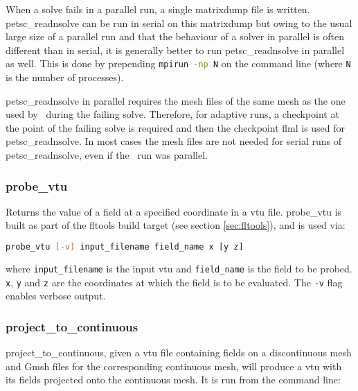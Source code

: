 When a solve fails in a parallel run, a single matrixdump file is written. petsc\_readnsolve can be run in serial on this matrixdump but owing to the usual large size of a parallel run and that the behaviour of a solver in parallel is often different than in serial, it is generally better to run petsc\_readnsolve in parallel as well. This is done by prepending \lstinline[language = Bash]+mpirun -np N+ on the command line (where \lstinline[language = Bash]+N+ is the number of processes).

petsc\_readnsolve in parallel requires the mesh files of the same mesh as the one used by \fluidity\ during the failing solve. Therefore, for adaptive runs, a checkpoint at the point of the failing solve is required and then the checkpoint flml is used for petsc\_readnsolve. In most cases the mesh files are not needed for serial runs of petsc\_readnsolve, even if the \fluidity\ run was parallel.


\subsubsection{probe\_vtu}
\label{sec:probe_vtu}

Returns the value of a field at a specified coordinate in a vtu file.
probe\_vtu is built as part of the fltools
build target (see section \ref{sec:fltools}), and is used via:

\begin{lstlisting}[language = Bash]
probe_vtu [-v] input_filename field_name x [y z]
\end{lstlisting}

where \lstinline[language = Bash]+input_filename+ is the input vtu and
\lstinline[language = Bash]+field_name+ is the field to be probed.
\lstinline[language = Bash]+x+, \lstinline[language = Bash]+y+ and
\lstinline[language = Bash]+z+ are the coordinates at which the field is to
be evaluated. The \lstinline[language = Bash]+-v+ flag enables verbose output.


\subsubsection{project\_to\_continuous}
\label{sec:project_to_continuous}
project\_to\_continuous, given a vtu file containing fields on a discontinuous mesh and Gmsh files for the corresponding continuous mesh, will produce a vtu with its fields projected onto the continuous mesh. It is run from the command line:

